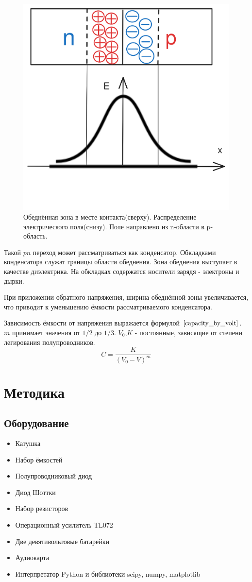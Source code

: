 \documentclass[a4paper, 12pt]{extarticle}
\begin{document}
\begin{figure}[htbp]
    \centering
    \includegraphics*[width = 0.5 \textwidth]{pics/ravnovesie.png}
    \caption{Обеднённая зона в месте контакта(сверху). Распределение электрического поля(снизу).
    Поле направлено из n-области в p-область.}
    \label{fig:ravnovesie}
\end{figure}

Такой $pn$ переход может рассматриваться как конденсатор. Обкладками конденсатора служат границы
области обеднения. Зона обеднения выступает в качестве диэлектрика. На обкладках содержатся носители
зарядя - электроны и дырки.

При приложении обратного напряжения, ширина обеднённой зоны увеличивается,
что приводит к уменьшению ёмкости рассматриваемого конденсатора.

Зависимость ёмкости от напряжения выражается формулой $\ref{capacity_by_volt}$.
$ m$ принимает значения от $1 / 2$ до $1 / 3$.
$V_0$,$ K$ - постоянные, зависящие от степени легирования полупроводников.
\begin{equation}
    C = \frac{K}{(V_0 - V)^m}
    \label{capacity_by_volt}
\end{equation}

\section*{\textcolor{header}{Методика}}
\subsection*{\textcolor{sub_header}{Оборудование}}
\begin{itemize}
    \item Катушка 
    \item Набор ёмкостей
    \item Полупроводниковый диод
    \item Диод Шоттки
    \item Набор резисторов
    \item Операционный усилитель TL072
    \item Две девятивольтовые батарейки
    \item Аудиокарта 
    \item Интерпретатор Python и библиотеки scipy, numpy, matplotlib
\end{itemize}
\end{document}
